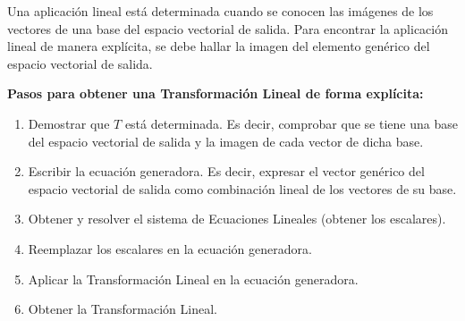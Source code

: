 \documentclass[compacto,10pt]{pubciencias-notas}
\begin{document}
\begin{obs}
    Una aplicación lineal está determinada cuando se conocen las imágenes de los vectores  de una base del espacio vectorial de salida. Para encontrar la aplicaci\'on lineal de manera expl\'icita, se debe hallar la imagen del elemento genérico del espacio vectorial de salida.
    
    \textbf{Pasos para obtener una Transformación Lineal de forma explícita:}
    \begin{enumerate}
    \item
        Demostrar que $T$ está determinada. Es decir, comprobar que se tiene una base del espacio vectorial de salida y la imagen de cada vector de dicha base.
    \item
        Escribir la ecuación generadora. Es decir, expresar el vector genérico del espacio vectorial de salida como combinación lineal de los vectores de su base.
    \item
        Obtener y resolver el sistema de Ecuaciones Lineales (obtener los escalares).
    \item
        Reemplazar los escalares en la ecuación generadora.
    \item
        Aplicar la Transformación Lineal en la ecuación generadora.
    \item
        Obtener la Transformación Lineal.
    \end{enumerate}

\end{obs}
\end{document}
